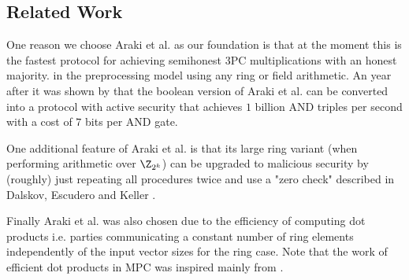 \subsection{Related Work}


One reason we choose Araki et al. \cite{CCS:AFLNO16} as our foundation
is that at the moment this is the fastest protocol for achieving semihonest
3PC multiplications with an honest majority.
in the preprocessing model using any ring or field arithmetic.
An year after it was shown by \cite{SP:ABFLLN17} that the
boolean version of Araki et al. can be
converted into a protocol with active security that achieves $1$ billion AND
triples per second with a cost of $7$ bits per AND gate.

One additional feature of Araki et al. \cite{CCS:AFLNO16} is that
its large ring variant (when performing arithmetic over $\Z_{2^k}$)
can be upgraded to malicious security by (roughly) just repeating all
procedures twice and use a "zero check" described in Dalskov, Escudero and
Keller \cite{cryptoeprint:2020:1330}.

Finally Araki et al. was also chosen due to the efficiency of computing dot products
i.e. parties
  communicating a constant number of ring elements independently of the input vector sizes
  for the ring case. Note that the work of efficient dot products in MPC was inspired mainly from
  \cite{CCS:LinNof17,C:CGHIKL18,EPRINT:ADEN19,cryptoeprint:2020:1330}.


